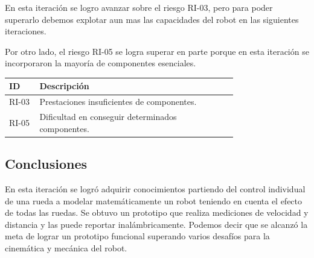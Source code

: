 En esta iteración se logro avanzar sobre el riesgo RI-03, pero para poder superarlo debemos explotar aun mas las capacidades del robot en las siguientes iteraciones.

Por otro lado, el riesgo RI-05 se logra superar en parte porque en esta iteración se incorporaron la mayoría de componentes esenciales.

\begin{center} \begin{tabular}{|p{0.10\linewidth}|p{0.65\linewidth}|}
\hline
    ID & Descripción \\
\hline
    RI-03 & Prestaciones insuficientes de componentes. \\
\hline
    RI-05 & Dificultad en conseguir determinados componentes. \\
\hline
\end{tabular} \end{center}

\subsection{Conclusiones}

En esta iteración se logró adquirir conocimientos partiendo del control individual de una rueda a modelar matemáticamente un robot teniendo en cuenta el efecto de todas las ruedas. Se obtuvo un prototipo que realiza mediciones de velocidad y distancia y las puede reportar inalámbricamente. Podemos decir que se alcanzó la meta de lograr un prototipo funcional superando varios desafíos para la cinemática y mecánica del robot.